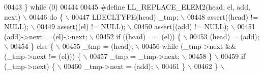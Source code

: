 \begin{DoxyCode}
00443 \textcolor{preprocessor}{\} while (0)}
00444 
00445 \textcolor{preprocessor}{#define LL\_REPLACE\_ELEM2(head, el, add, next)                                                  \(\backslash\)}
00446 \textcolor{preprocessor}{do \{                                                                                           \(\backslash\)}
00447 \textcolor{preprocessor}{ LDECLTYPE(head) \_tmp;                                                                         \(\backslash\)}
00448 \textcolor{preprocessor}{ assert((head) != NULL);                                                                       \(\backslash\)}
00449 \textcolor{preprocessor}{ assert((el) != NULL);                                                                         \(\backslash\)}
00450 \textcolor{preprocessor}{ assert((add) != NULL);                                                                        \(\backslash\)}
00451 \textcolor{preprocessor}{ (add)->next = (el)->next;                                                                     \(\backslash\)}
00452 \textcolor{preprocessor}{ if ((head) == (el)) \{                                                                         \(\backslash\)}
00453 \textcolor{preprocessor}{  (head) = (add);                                                                              \(\backslash\)}
00454 \textcolor{preprocessor}{ \} else \{                                                                                      \(\backslash\)}
00455 \textcolor{preprocessor}{  \_tmp = (head);                                                                               \(\backslash\)}
00456 \textcolor{preprocessor}{  while (\_tmp->next && (\_tmp->next != (el))) \{                                                 \(\backslash\)}
00457 \textcolor{preprocessor}{   \_tmp = \_tmp->next;                                                                          \(\backslash\)}
00458 \textcolor{preprocessor}{  \}                                                                                            \(\backslash\)}
00459 \textcolor{preprocessor}{  if (\_tmp->next) \{                                                                            \(\backslash\)}
00460 \textcolor{preprocessor}{    \_tmp->next = (add);                                                                        \(\backslash\)}
00461 \textcolor{preprocessor}{  \}                                                                                            \(\backslash\)}
00462 \textcolor{preprocessor}{ \}                                                                                             \(\backslash\)}

\end{DoxyCode}
